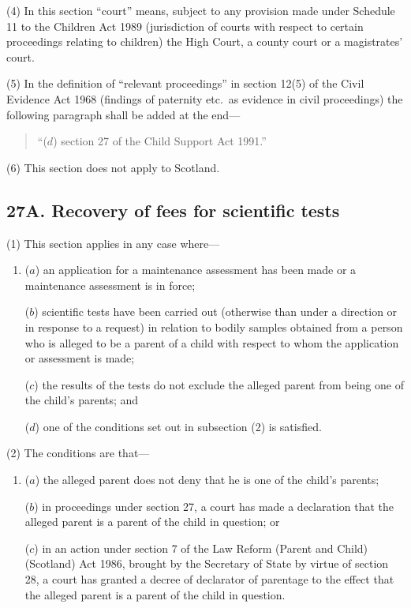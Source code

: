 \documentclass[12pt,a4paper]{article}
\begin{document}
(4) In this section “court” means, subject to any provision made under Schedule 11 to the Children Act 1989 (jurisdiction of courts with respect to certain proceedings relating to children) the High Court, a county court or a magistrates' court.

(5) In the definition of “relevant proceedings” in section 12(5)  of the Civil Evidence Act 1968 (findings of paternity etc.\ as evidence in civil proceedings) the following paragraph shall be added at the end—
\begin{quotation}
“($d$) section 27 of the Child Support Act 1991.”
\end{quotation}

(6) This section does not apply to Scotland.


\subsection{27A. Recovery of fees for scientific tests}

(1) This section applies in any case where—
\begin{enumerate}\item[]
($a$) an application for a maintenance assessment has been made or a maintenance assessment is in force;

($b$) scientific tests have been carried out (otherwise than under a direction or in response to a request) in relation to bodily samples obtained from a person who is alleged to be a parent of a child with respect to whom the application or assessment is made;

($c$) the results of the tests do not exclude the alleged parent from being one of the child’s parents; and

($d$) one of the conditions set out in subsection (2) is satisfied.
\end{enumerate}

(2) The conditions are that—
\begin{enumerate}\item[]
($a$) the alleged parent does not deny that he is one of the child’s parents;

($b$) in proceedings under section 27, a court has made a declaration that the alleged parent is a parent of the child in question; or

($c$) in an action under section 7 of the Law Reform (Parent and Child) (Scotland) Act 1986, brought by the Secretary of State by virtue of section 28, a court has granted a decree of declarator of parentage to the effect that the alleged parent is a parent of the child in question.
\end{enumerate}
\end{document}
